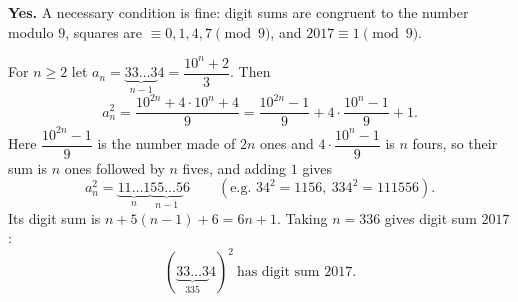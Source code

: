 \textbf{Yes.} A necessary condition is fine: digit sums are congruent to the number modulo $9$, squares are $\equiv0,1,4,7\pmod9$, and $2017\equiv1\pmod9$.

For $n\ge2$ let $a_n=\underbrace{33\ldots3}_{n-1}4=\dfrac{10^n+2}{3}$. Then
\[
a_n^2=\dfrac{10^{2n}+4\cdot10^n+4}{9}=\dfrac{10^{2n}-1}{9}+4\cdot\dfrac{10^n-1}{9}+1 .
\]
Here $\dfrac{10^{2n}-1}{9}$ is the number made of $2n$ ones and $4\cdot\dfrac{10^n-1}{9}$ is $n$ fours, so their sum is $n$ ones followed by $n$ fives, and adding $1$ gives
\[
a_n^2=\underbrace{11\ldots1}_{n}\underbrace{55\ldots5}_{n-1}6 \qquad(\text{e.g. }34^2=1156,\ 334^2=111556).
\]
Its digit sum is $n+5(n-1)+6=6n+1$. Taking $n=336$ gives digit sum $2017$:
\[
\boxed{\left(\underbrace{33\ldots3}_{335}4\right)^2}\ \text{has digit sum }2017 .
\]
